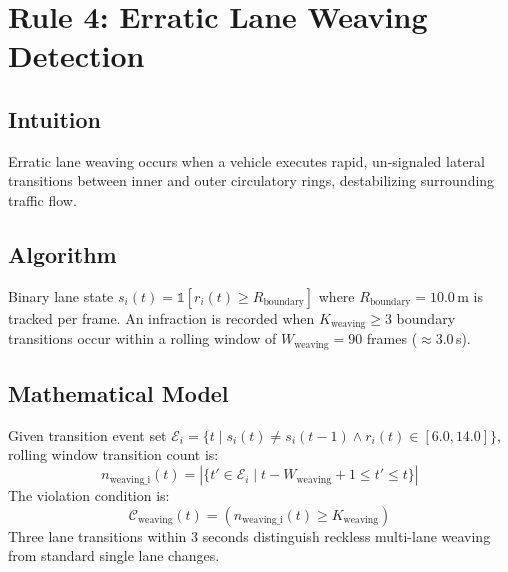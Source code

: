 \section{Rule 4: Erratic Lane Weaving Detection}
\label{sec:rule4}

\subsection{Intuition}
Erratic lane weaving occurs when a vehicle executes rapid, un-signaled lateral transitions between inner and outer circulatory rings, destabilizing surrounding traffic flow.

\subsection{Algorithm}
Binary lane state $s_i(t) = \mathbb{1}[r_i(t) \ge R_{\text{boundary}}]$ where $R_{\text{boundary}} = 10.0$\,m is tracked per frame. An infraction is recorded when $K_{\text{weaving}} \ge 3$ boundary transitions occur within a rolling window of $W_{\text{weaving}} = 90$ frames ($\approx 3.0$\,s).

\subsection{Mathematical Model}
Given transition event set $\mathcal{E}_i = \{ t \mid s_i(t) \neq s_i(t{-}1) \land r_i(t) \in [6.0, 14.0] \}$, rolling window transition count is:
\begin{equation}
    n_{\text{weaving\_i}}(t) = | \{ t' \in \mathcal{E}_i \mid t - W_{\text{weaving}} + 1 \le t' \le t \} |
\end{equation}
The violation condition is:
\begin{equation}
    \mathcal{C}_{\text{weaving}}(t) = \left( n_{\text{weaving\_i}}(t) \ge K_{\text{weaving}} \right)
\end{equation}
Three lane transitions within 3 seconds distinguish reckless multi-lane weaving from standard single lane changes.

